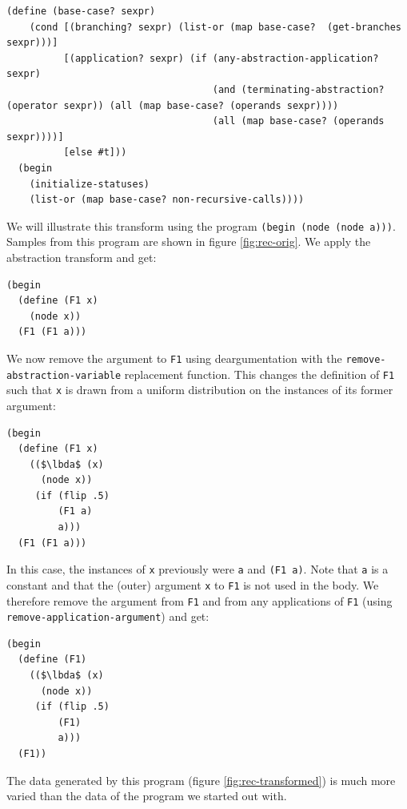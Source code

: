 \documentclass[a4paper,10pt]{article}
\newcommand{\lbda}{\color[rgb]{0,.3,.7} \lambda}
\begin{document}
\begin{lstlisting}[frame=trbl]
  (define (base-case? sexpr)
    (cond [(branching? sexpr) (list-or (map base-case?  (get-branches sexpr)))]
          [(application? sexpr) (if (any-abstraction-application? sexpr)
                                    (and (terminating-abstraction? (operator sexpr)) (all (map base-case? (operands sexpr))))
                                    (all (map base-case? (operands sexpr))))]
          [else #t]))
  (begin
    (initialize-statuses)
    (list-or (map base-case? non-recursive-calls))))
\end{lstlisting}

We will illustrate this transform using the program \texttt{(begin (node (node a)))}. Samples from this program are shown in figure \ref{fig:rec-orig}. We apply the abstraction transform and get:
\begin{lstlisting}[mathescape=true]
(begin
  (define (F1 x)
    (node x))
  (F1 (F1 a)))
\end{lstlisting}
We now remove the argument to \texttt{F1} using deargumentation with the \texttt{remove-abstraction-variable} replacement function. This changes the definition of \texttt{F1} such that \texttt{x} is drawn from a uniform distribution on the instances of its former argument:
\begin{lstlisting}
(begin
  (define (F1 x)
    (($\lbda$ (x)
      (node x))
     (if (flip .5)
         (F1 a)
         a)))
  (F1 (F1 a)))
\end{lstlisting}
In this case, the instances of \texttt{x} previously were \texttt{a} and \texttt{(F1 a)}. Note that \texttt{a} is a constant and that the (outer) argument \texttt{x} to \texttt{F1} is not used in the body. We therefore remove the argument from \texttt{F1} and from any applications of \texttt{F1} (using \texttt{remove-application-argument}) and get:
\begin{lstlisting}[mathescape=true]
(begin
  (define (F1)
    (($\lbda$ (x)
      (node x))
     (if (flip .5)
         (F1)
         a)))
  (F1))
\end{lstlisting}
The data generated by this program (figure \ref{fig:rec-transformed}) is much more varied than the data of the program we started out with.
\end{document}
